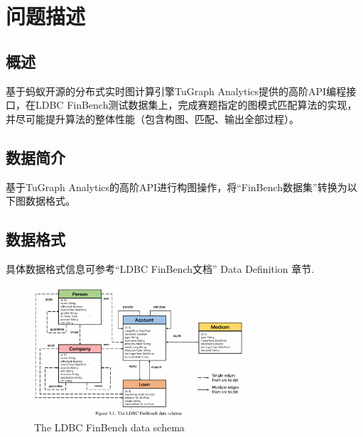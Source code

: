 \section{问题描述}
\subsection{概述}
基于蚂蚁开源的分布式实时图计算引擎TuGraph Analytics提供的⾼阶API编程接口，在LDBC FinBench测试数据集上，完成赛题指定的图模式匹配算法的实现，并尽可能提升算法的整体性能（包含构图、匹配、输出全部过程）。

\subsection{数据简介}
基于TuGraph Analytics的高阶API进行构图操作，将``FinBench数据集''转换为以下图数据格式。

\subsection{数据格式}
具体数据格式信息可参考``LDBC FinBench文档''\cite{ref3} Data Definition 章节.

\begin{figure}[H]
  \begin{center}
    \includegraphics[width=0.70\textwidth]{./figures/蚂蚁2-1-728694.png}
  \end{center}
  \caption{The LDBC FinBench data schema}
\end{figure}

